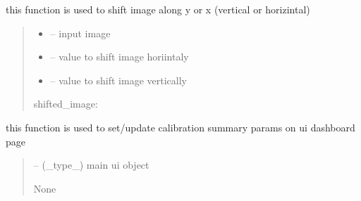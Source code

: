 \documentclass[letterpaper,10pt,english]{sphinxmanual}
\begin{document}
\begin{savenotes}\begin{fulllineitems}
\label{\detokenize{setting/backend/camera_funcs:oxin.backend.camera_funcs.shift_calibration_image}}
\pysigstartsignatures
{}
\pysigstopsignatures
\sphinxAtStartPar
this function is used to shift image along y or x (vertical or horizintal)
\begin{quote}\begin{description}
\begin{itemize}
\item {} 
\sphinxAtStartPar
{} – input image

\item {} 
\sphinxAtStartPar
{} – value to shift image horiintaly

\item {} 
\sphinxAtStartPar
{} – value to shift image vertically

\end{itemize}

\sphinxAtStartPar
shifted\_image:

\end{description}\end{quote}

\end{fulllineitems}\end{savenotes}


\begin{savenotes}\begin{fulllineitems}
\label{\detokenize{setting/backend/camera_funcs:oxin.backend.camera_funcs.show_calibration_summary}}
\pysigstartsignatures
{}
\pysigstopsignatures
\sphinxAtStartPar
this function is used to set/update calibration summary params on ui dashboard page
\begin{quote}\begin{description}
\sphinxAtStartPar
{} – (\_type\_) main ui object

\sphinxAtStartPar
None

\end{description}\end{quote}

\end{fulllineitems}\end{savenotes}
\end{document}
